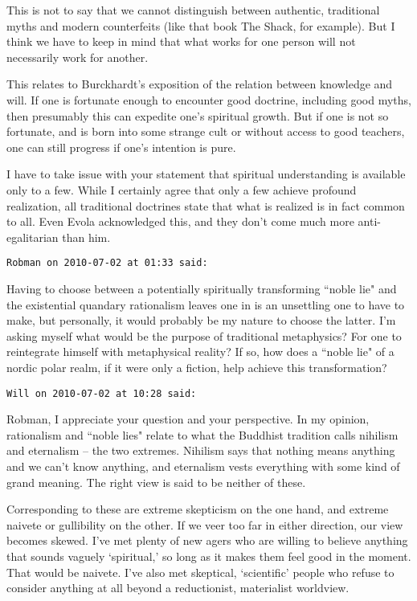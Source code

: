 \begin{footnotesize}
\begin{sffamily}
This is not to say that we cannot distinguish between authentic, traditional myths and modern counterfeits (like that book The Shack, for example). But I think we have to keep in mind that what works for one person will not necessarily work for another.

This relates to Burckhardt's exposition of the relation between knowledge and will. If one is fortunate enough to encounter good doctrine, including good myths, then presumably this can expedite one's spiritual growth. But if one is not so fortunate, and is born into some strange cult or without access to good teachers, one can still progress if one's intention is pure.

I have to take issue with your statement that spiritual understanding is available only to a few. While I certainly agree that only a few achieve profound realization, all traditional doctrines state that what is realized is in fact common to all. Even Evola acknowledged this, and they don't come much more anti-egalitarian than him.


\hfill

\texttt{Robman on 2010-07-02 at 01:33 said: }

Having to choose between a potentially spiritually transforming ``noble lie" and the existential quandary rationalism leaves one in is an unsettling one to have to make, but personally, it would probably be my nature to choose the latter. I'm asking myself what would be the purpose of traditional metaphysics? For one to reintegrate himself with metaphysical reality? If so, how does a ``noble lie" of a nordic polar realm, if it were only a fiction, help achieve this transformation?


\hfill

\texttt{Will on 2010-07-02 at 10:28 said: }

Robman, I appreciate your question and your perspective. In my opinion, rationalism and ``noble lies" relate to what the Buddhist tradition calls nihilism and eternalism – the two extremes. Nihilism says that nothing means anything and we can't know anything, and eternalism vests everything with some kind of grand meaning. The right view is said to be neither of these.

Corresponding to these are extreme skepticism on the one hand, and extreme naivete or gullibility on the other. If we veer too far in either direction, our view becomes skewed. I've met plenty of new agers who are willing to believe anything that sounds vaguely `spiritual,' so long as it makes them feel good in the moment. That would be naivete. I've also met skeptical, `scientific' people who refuse to consider anything at all beyond a reductionist, materialist worldview.


\end{sffamily}
\end{footnotesize}
